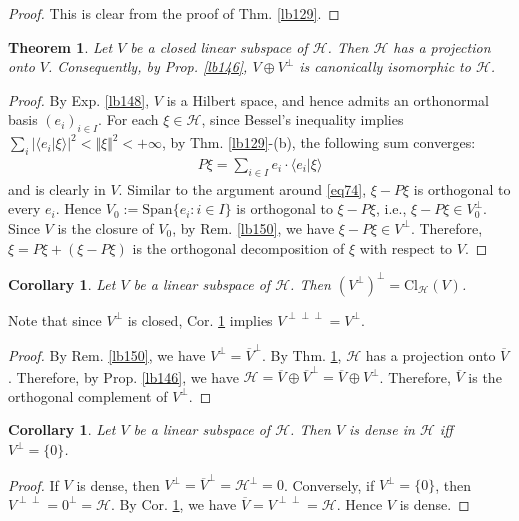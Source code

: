 \documentclass[12pt,b5paper,notitlepage]{article}
\theoremstyle{definition}
\theoremstyle{plain}
\newtheorem{thm}[df]{Theorem}
\newtheorem{co}[df]{Corollary}
\newcommand{\ovl}{\overline}
\newcommand{\Span}{\mathrm{Span}}
\newcommand{\bk}[1]{\langle {#1}\rangle}
\newcommand{\Cl}{\mathrm{Cl}}
\newcommand{\MH}{\mathcal H}
\numberwithin{equation}{section}
\begin{document}
\begin{proof}
This is clear from the proof of Thm. \ref{lb129}.
\end{proof}


\begin{thm}\label{lb149}
Let $V$ be a closed linear subspace of $\MH$. Then $\MH$ has a projection onto $V$. Consequently, by Prop. \ref{lb146}, $V\oplus V^\perp$ is canonically isomorphic to $\MH$.
\end{thm}

\begin{proof}
By Exp. \ref{lb148}, $V$ is a Hilbert space, and hence admits an orthonormal basis $(e_i)_{i\in I}$. For each $\xi\in\MH$, since Bessel's inequality implies $\sum_i|\bk{e_i|\xi}|^2<\Vert\xi\Vert^2<+\infty$, by Thm. \ref{lb129}-(b), the following sum converges:
\begin{align*}
P\xi=\sum_{i\in I}e_i\cdot \bk{e_i|\xi}
\end{align*}
and is clearly in $V$. Similar to the argument around \eqref{eq74}, $\xi-P\xi$ is orthogonal to every $e_i$. Hence $V_0:=\Span\{e_i:i\in I\}$ is orthogonal to $\xi-P\xi$, i.e., $\xi-P\xi\in V_0^\perp$. Since $V$ is the closure of $V_0$, by Rem. \ref{lb150}, we have $\xi-P\xi\in V^\perp$. Therefore, $\xi=P\xi+(\xi-P\xi)$ is the orthogonal decomposition of $\xi$ with respect to $V$.
\end{proof}


\begin{co}\label{lb151}
Let $V$ be a linear subspace of $\MH$. Then $(V^\perp)^\perp=\Cl_\MH(V)$. 
\end{co}

Note that since $V^\perp$ is closed, Cor. \ref{lb151} implies $V^{\perp\perp\perp}=V^\perp$.

\begin{proof}
By Rem. \ref{lb150}, we have $V^\perp=\ovl V^\perp$. By Thm. \ref{lb149}, $\MH$ has a projection onto $\ovl V$. Therefore, by Prop. \ref{lb146}, we have $\MH=\ovl V\oplus \ovl V^\perp=\ovl V\oplus V^\perp$. Therefore, $\ovl V$ is the orthogonal complement of $V^\perp$.
\end{proof}

\begin{co}\label{lb369}
Let $V$ be a linear subspace of $\MH$. Then $V$ is dense in $\MH$ iff $V^\perp=\{0\}$. 
\end{co}


\begin{proof}
If $V$ is dense, then $V^\perp=\ovl V^\perp=\MH^\perp=0$. Conversely, if $V^\perp=\{0\}$, then $V^{\perp\perp}=0^\perp=\MH$. By Cor. \ref{lb151}, we have $\ovl V=V^{\perp\perp}=\MH$. Hence $V$ is dense. 
\end{proof}
\end{document}
